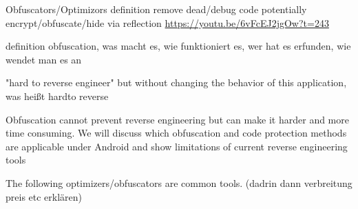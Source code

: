Obfuscators/Optimizors definition\newline
remove dead/debug code\newline
potentially encrypt/obfuscate/hide via reflection\newline
\url{https://youtu.be/6vFcEJ2jgOw?t=243}\newline

definition obfuscation, was macht es, wie funktioniert es, wer hat es erfunden, wie wendet man es an\newline

"hard to reverse engineer" but without changing the behavior of this
application, was heißt hardto reverse\newline

Obfuscation cannot prevent reverse engineering but can make it harder and more time consuming. We will discuss which obfuscation and code protection methods are applicable under Android and show limitations of current reverse engineering tools\newline

The following optimizers/obfuscators are common tools. (dadrin dann verbreitung preis etc erklären)
